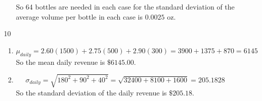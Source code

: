 \documentclass[12pt,letterpaper]{article}
\begin{document}
\begin{enumerate}
\begin{enumerate}
\begin{enumerate}[label=(\arabic*)]
              So 64 bottles are needed in each case for the standard deviation of the average volume per bottle in each case is $0.0025$ oz.
          \end{enumerate}
        \item [10]
          \begin{enumerate}[label=(\arabic*)]
            \item
              \[
                \mu_{daily} = 2.60(1500) + 2.75(500) + 2.90(300) = 3900 + 1375 + 870 = 6145
              \]
              So the mean daily revenue is $\$6145.00$.
            \item
              \[
                \sigma_{daily} = \sqrt{180^2 + 90^2 + 40^2} = \sqrt{32400 + 8100 + 1600} = 205.1828
              \]
              So the standard deviation of the daily revenue is $\$205.18$.
          \end{enumerate}
      \end{enumerate}
  \end{enumerate}
\end{document}
